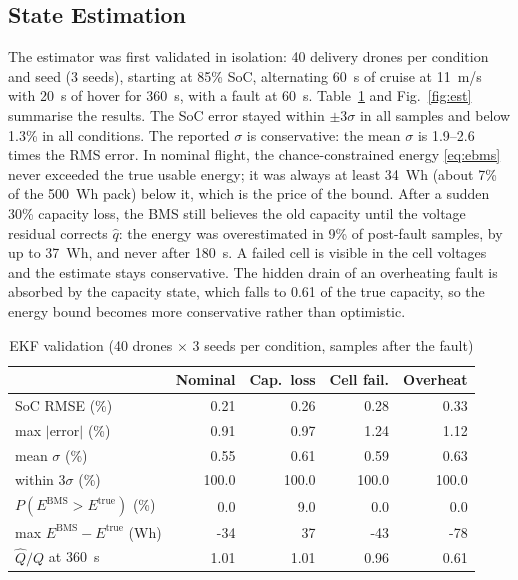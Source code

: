 \documentclass[journal]{IEEEtran}
\newcommand{\Ebms}{E^{\mathrm{BMS}}}
\begin{document}
\subsection{State Estimation}
The estimator was first validated in isolation: 40 delivery drones per condition and seed (3 seeds), starting at 85\% SoC, alternating 60~s of cruise at 11~m/s with 20~s of hover for 360~s, with a fault at 60~s. Table~\ref{tab:est} and Fig.~\ref{fig:est} summarise the results. The SoC error stayed within $\pm 3\sigma$ in all samples and below 1.3\% in all conditions. The reported $\sigma$ is conservative: the mean $\sigma$ is 1.9--2.6 times the RMS error. In nominal flight, the chance-constrained energy \eqref{eq:ebms} never exceeded the true usable energy; it was always at least 34~Wh (about 7\% of the 500~Wh pack) below it, which is the price of the bound. After a sudden 30\% capacity loss, the BMS still believes the old capacity until the voltage residual corrects $\hat q$: the energy was overestimated in 9\% of post-fault samples, by up to 37~Wh, and never after 180~s. A failed cell is visible in the cell voltages and the estimate stays conservative. The hidden drain of an overheating fault is absorbed by the capacity state, which falls to 0.61 of the true capacity, so the energy bound becomes more conservative rather than optimistic.

\begin{table}[t]
\centering
\caption{EKF validation (40 drones $\times$ 3 seeds per condition, samples after the fault)}
\label{tab:est}
\footnotesize
\setlength{\tabcolsep}{3pt}
\begin{tabular}{@{}lrrrr@{}}
\toprule
 & Nominal & Cap.\ loss & Cell fail. & Overheat \\
\midrule
SoC RMSE (\%) & 0.21 & 0.26 & 0.28 & 0.33 \\
max $|$error$|$ (\%) & 0.91 & 0.97 & 1.24 & 1.12 \\
mean $\sigma$ (\%) & 0.55 & 0.61 & 0.59 & 0.63 \\
within $3\sigma$ (\%) & 100.0 & 100.0 & 100.0 & 100.0 \\
$P(\Ebms > E^{\mathrm{true}})$ (\%) & 0.0 & 9.0 & 0.0 & 0.0 \\
max $\Ebms - E^{\mathrm{true}}$ (Wh) & -34 & 37 & -43 & -78 \\
$\hat Q / Q$ at 360~s & 1.01 & 1.01 & 0.96 & 0.61 \\
\bottomrule
\end{tabular}
\end{table}
\end{document}
